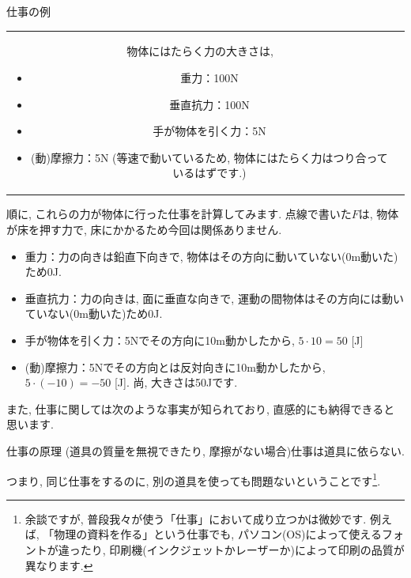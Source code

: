 \documentclass[11pt,dvipdfmx]{jsarticle}
\numberwithin{equation}{section} %
\begin{document}
\begin{exbox}{仕事の例}
\begin{center}
\begin{tabular}{cc}
    \begin{minipage}{6cm}
    物体にはたらく力の大きさは, 
    \begin{itemize}
        \item 重力：100N
        \item 垂直抗力：100N
        \item 手が物体を引く力：5N
        \item (動)摩擦力：5N (等速で動いているため, 物体にはたらく力はつり合っているはずです.)
    \end{itemize}
    \end{minipage}
    \end{tabular}
    \end{center}
    順に, これらの力が物体に行った仕事を計算してみます. 点線で書いた$F$は, 物体が床を押す力で, 床にかかるため今回は関係ありません. 
    \begin{itemize}
        \item 重力：力の向きは鉛直下向きで, 物体はその方向に動いていない(0m動いた)ため0J.
        \item 垂直抗力：力の向きは, 面に垂直な向きで, 運動の間物体はその方向には動いていない(0m動いた)ため0J.
        \item 手が物体を引く力：5Nでその方向に10m動かしたから, $5\cdot 10 = 50$ [J]
        \item (動)摩擦力：5Nでその方向とは反対向きに10m動かしたから, $5\cdot (-10) = -50$ [J]. 尚, 大きさは50Jです. 
    \end{itemize}
\end{exbox}
また, 仕事に関しては次のような事実が知られており, 直感的にも納得できると思います.
\begin{freebox}{仕事の原理}
    (道具の質量を無視できたり, 摩擦がない場合)仕事は道具に依らない.
\end{freebox}
つまり, 同じ仕事をするのに, 別の道具を使っても問題ないということです\footnote{余談ですが, 普段我々が使う「仕事」において成り立つかは微妙です. 例えば, 「物理の資料を作る」という仕事でも, パソコン(OS)によって使えるフォントが違ったり, 印刷機(インクジェットかレーザーか)によって印刷の品質が異なります.}. 
 
\end{document}
